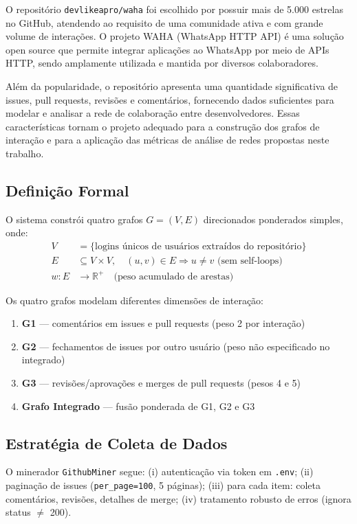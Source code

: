 \documentclass[12pt]{article}
\begin{document}
O repositório \texttt{devlikeapro/waha} foi escolhido por possuir mais de 5.000 estrelas no GitHub, atendendo ao requisito de uma comunidade ativa e com grande volume de interações. O projeto WAHA (WhatsApp HTTP API) é uma solução open source que permite integrar aplicações ao WhatsApp por meio de APIs HTTP, sendo amplamente utilizada e mantida por diversos colaboradores.

Além da popularidade, o repositório apresenta uma quantidade significativa de issues, pull requests, revisões e comentários, fornecendo dados suficientes para modelar e analisar a rede de colaboração entre desenvolvedores. Essas características tornam o projeto adequado para a construção dos grafos de interação e para a aplicação das métricas de análise de redes propostas neste trabalho.

\subsection{Definição Formal}

O sistema constrói quatro grafos $G = (V, E)$ direcionados ponderados simples, onde:
\begin{align}
  V &= \{\text{logins únicos de usuários extraídos do repositório}\} \\
  E &\subseteq V \times V, \quad (u, v) \in E \Rightarrow u \neq v \text{ (sem self-loops)} \\
  w: E &\to \mathbb{R}^+ \quad \text{(peso acumulado de arestas)}
\end{align}

Os quatro grafos modelam diferentes dimensões de interação:
\begin{enumerate}
  \item \textbf{G1} --- comentários em issues e pull requests (peso 2 por interação)
  \item \textbf{G2} --- fechamentos de issues por outro usuário (peso não especificado no integrado)
  \item \textbf{G3} --- revisões/aprovações e merges de pull requests (pesos 4 e 5)
  \item \textbf{Grafo Integrado} --- fusão ponderada de G1, G2 e G3
\end{enumerate}

\subsection{Estratégia de Coleta de Dados}

O minerador \texttt{GithubMiner} segue: (i) autenticação via token em \texttt{.env}; (ii) paginação de issues (\texttt{per\_page=100}, 5 páginas); (iii) para cada item: coleta comentários, revisões, detalhes de merge; (iv) tratamento robusto de erros (ignora status $\neq$ 200).
\end{document}
